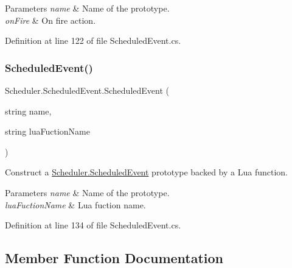 \begin{DoxyParams}{Parameters}
{\em name} & Name of the prototype.\\
\hline
{\em on\+Fire} & On fire action.\\
\hline
\end{DoxyParams}


Definition at line 122 of file Scheduled\+Event.\+cs.

\mbox{\label{class_scheduler_1_1_scheduled_event_af331abbf2942f9889e7013587bfa5f8a}} 
\subsubsection{\texorpdfstring{Scheduled\+Event()}{ScheduledEvent()}\hspace{0.1cm}{\footnotesize\ttfamily [6/6]}}
{\footnotesize\ttfamily Scheduler.\+Scheduled\+Event.\+Scheduled\+Event (\begin{DoxyParamCaption}\item[{string}]{name,  }\item[{string}]{lua\+Fuction\+Name }\end{DoxyParamCaption})}



Construct a \hyperlink{class_scheduler_1_1_scheduled_event}{Scheduler.\+Scheduled\+Event} prototype backed by a Lua function. 


\begin{DoxyParams}{Parameters}
{\em name} & Name of the prototype.\\
\hline
{\em lua\+Fuction\+Name} & Lua fuction name.\\
\hline
\end{DoxyParams}


Definition at line 134 of file Scheduled\+Event.\+cs.



\subsection{Member Function Documentation}
\mbox{\label{class_scheduler_1_1_scheduled_event_a232f2ce8f94c538c9e8be6af7177c8fd}} 
